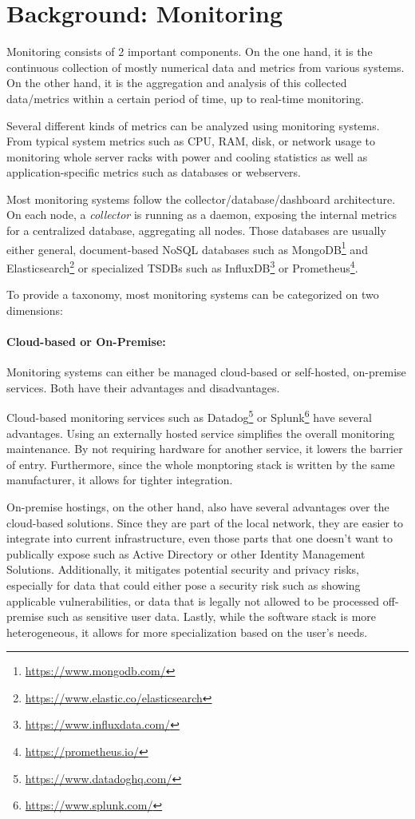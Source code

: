 \section{Background: Monitoring}
Monitoring consists of 2 important components. On the one hand, it is the continuous 
collection of mostly numerical data and metrics from various systems. On the other hand, it 
is the aggregation and analysis of this collected data/metrics within a certain period of 
time, up to real-time monitoring.

Several different kinds of metrics can be analyzed using monitoring systems. From typical
system metrics such as CPU, RAM, disk, or network usage to monitoring whole server racks
with power and cooling statistics as well as application-specific metrics such as databases
or webservers.

Most monitoring systems follow the collector/database/dashboard architecture. On each node,
a \emph{collector} is running as a daemon, exposing the internal metrics for a centralized
database, aggregating all nodes. Those databases are usually either general, document-based
NoSQL databases such as MongoDB\footnote{\url{https://www.mongodb.com/}} and 
Elasticsearch\footnote{\url{https://www.elastic.co/elasticsearch}} or specialized \acp{TSDB}
such as InfluxDB\footnote{\url{https://www.influxdata.com/}} or Prometheus\footnote{
\url{https://prometheus.io/}}.

To provide a taxonomy, most monitoring systems can be categorized on two dimensions:

\paragraph{Cloud-based or On-Premise:} Monitoring systems can either be managed cloud-based 
or self-hosted, on-premise services. Both have their advantages and disadvantages.

Cloud-based monitoring services such as Datadog\footnote{\url{https://www.datadoghq.com/}}
or Splunk\footnote{\url{https://www.splunk.com/}} have several advantages. Using an 
externally hosted service simplifies the overall monitoring maintenance. By not requiring
hardware for another service, it lowers the barrier of entry. Furthermore, since the whole
monptoring stack is written by the same manufacturer, it allows for tighter integration.

On-premise hostings, on the other hand, also have several advantages over the cloud-based 
solutions. Since they are part of the local network, they are easier to integrate into current
infrastructure, even those parts that one doesn't want to publically expose such as Active 
Directory or other Identity Management Solutions. Additionally, it mitigates potential security and privacy risks, especially for data
that could either pose a security risk such as showing applicable vulnerabilities, or data that is
legally not allowed to be processed off-premise such as sensitive user data. Lastly, while the 
software stack is more heterogeneous, it allows for more specialization based on the user's needs.

